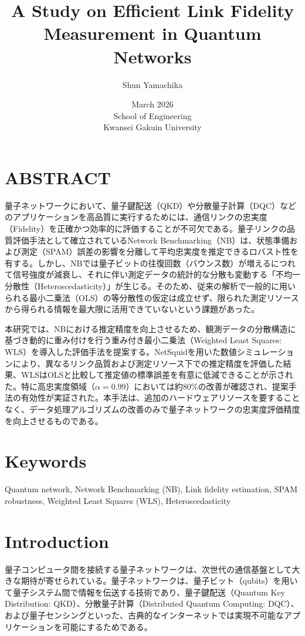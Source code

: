 \documentclass[12pt,a4paper,titlepage,dvipdfmx]{article}
\title{\LARGE \bf A Study on Efficient Link Fidelity\\ Measurement in Quantum Networks}
\author{\Large Shun Yamachika}
\date{\Large March 2026 \\[10mm]
  School of Engineering \\
  Kwansei Gakuin University
}
\begin{document}
\maketitle

\section*{ABSTRACT}
量子ネットワークにおいて、量子鍵配送（QKD）や分散量子計算（DQC）などのアプリケーションを高品質に実行するためには、通信リンクの忠実度（Fidelity）を正確かつ効率的に評価することが不可欠である。量子リンクの品質評価手法として確立されているNetwork Benchmarking（NB）は、状態準備および測定（SPAM）誤差の影響を分離して平均忠実度を推定できるロバスト性を有する。しかし、NBでは量子ビットの往復回数（バウンス数）が増えるにつれて信号強度が減衰し、それに伴い測定データの統計的な分散も変動する「不均一分散性（Heteroscedasticity）」が生じる。そのため、従来の解析で一般的に用いられる最小二乗法（OLS）の等分散性の仮定は成立せず、限られた測定リソースから得られる情報を最大限に活用できていないという課題があった。

本研究では、NBにおける推定精度を向上させるため、観測データの分散構造に基づき動的に重み付けを行う重み付き最小二乗法（Weighted Least Squares: WLS）を導入した評価手法を提案する。NetSquidを用いた数値シミュレーションにより、異なるリンク品質および測定リソース下での推定精度を評価した結果、WLSはOLSと比較して推定値の標準誤差を有意に低減できることが示された。特に高忠実度領域（$\alpha=0.99$）においては約80\%の改善が確認され、提案手法の有効性が実証された。本手法は、追加のハードウェアリソースを要することなく、データ処理アルゴリズムの改善のみで量子ネットワークの忠実度評価精度を向上させるものである。


\section*{Keywords}
Quantum network, Network Benchmarking (NB), Link fidelity estimation, SPAM robustness, Weighted Least Squares (WLS), Heteroscedasticity
\newpage

\tableofcontents
\newpage

\listoffigures
\newpage

\listoftables
\newpage


\section{Introduction}
\label{sec:intro}
量子コンピュータ間を接続する量子ネットワークは、次世代の通信基盤として大きな期待が寄せられている。量子ネットワークは、量子ビット（qubits）を用いて量子システム間で情報を伝送する技術であり、量子鍵配送（Quantum Key Distribution: QKD）、分散量子計算（Distributed Quantum Computing: DQC）、および量子センシングといった、古典的なインターネットでは実現不可能なアプリケーションを可能にするためである\cite{wehner2018quantum}。
\end{document}

